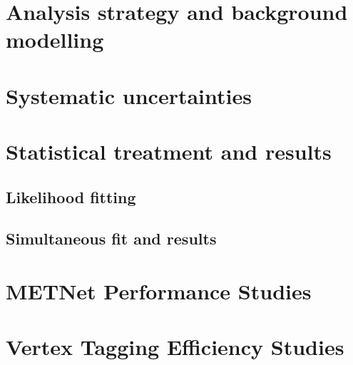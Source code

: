 \section{Analysis strategy and background modelling} %
\label{sec:bkg}

\FloatBarrier

\section{Systematic uncertainties} %
\label{sec:systs}

\FloatBarrier

\section{Statistical treatment and results} %
\label{sec:stats}

\subsection{Likelihood fitting}
\label{sec:likelihood_fitting}
\FloatBarrier
\subsection{Simultaneous fit and results}
\label{sec:simfit}

\FloatBarrier


% 

\section{METNet Performance Studies}\label{sec:metnet-appendix}


\section{Vertex Tagging Efficiency Studies}\label{sec:vertex-tagging}



% 

